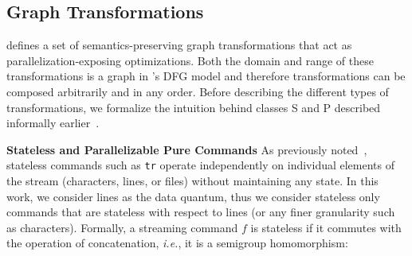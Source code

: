 \documentclass[letterpaper,twocolumn,10pt]{article}
\newcommand{\eg}{{\em e.g.}, }
\newcommand{\ie}{{\em i.e.}, }
\newcommand{\heading}[1]{\vspace{4pt}\noindent\textbf{#1}\enspace}
\newcommand{\ttt}[1]{\texttt{#1}}
\newcommand{\cn}[1]{\mbox{\textcircled{\footnotesize #1}}}
\newcommand{\sta}{\cn{\textsc{S}}\xspace}
\newcommand{\pur}{\cn{\textsc{P}}\xspace}
\newcommand{\todo}[1]{\hl{#1}\xspace}
\newcommand{\nv}[1]{[{\color{cyan}nv: #1}]}
\newcommand{\kk}[1]{[{\color{magenta}kk: #1}]}
\newcommand{\km}[1]{[{\color{blue}km: #1}]}
\begin{document}
\subsection{Graph Transformations}
\label{ir:transformations}


\sys defines a set of semantics-preserving graph transformations
that act as parallelization-exposing optimizations. Both the domain
and range of these transformations is a graph in \sys's DFG model
and therefore transformations can be composed arbitrarily and in any order.
Before describing the different types of transformations, we formalize
the intuition behind classes \sta and \pur described informally
earlier~.




\heading{Stateless and Parallelizable Pure Commands}
As previously noted~, stateless commands such as \ttt{tr}
operate independently on individual elements of the stream
(characters, lines, or files) without maintaining any state. In this
work, we consider lines as the data quantum, thus we consider stateless only commands that are
stateless with respect to lines (or any finer granularity such as
characters). Formally, a streaming command $f$ is stateless if it commutes with
the operation of concatenation, \ie it is a semigroup homomorphism:
\end{document}
